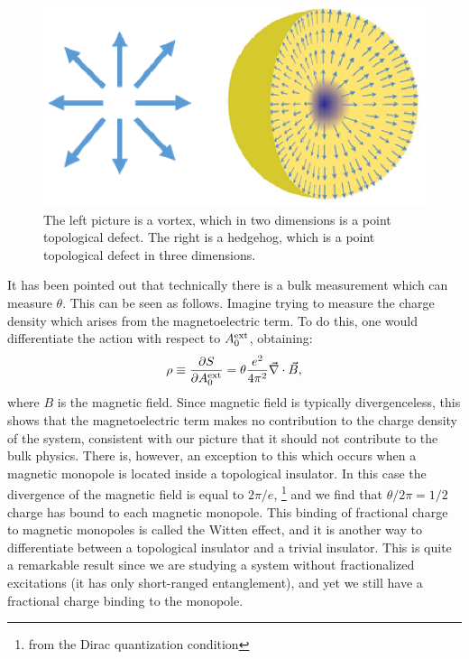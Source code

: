 \begin{figure}
\includegraphics[width=\linewidth]{figures/defects.eps}
\caption{ The left picture is a vortex, which in two dimensions is a point topological defect. The right is a hedgehog, which is a point topological defect in three dimensions.
\label{topo_defects}}
\end{figure}

It has been pointed out \cite{FranzWitten} that technically there is a bulk measurement which can measure $\theta$. This can be seen as follows. Imagine trying to measure the charge density which arises from the magnetoelectric term. To do this, one would differentiate the action with respect to $A^{\rm ext}_0$, obtaining:
\begin{equation}
\rho\equiv\frac{\partial S}{\partial A^{\rm ext}_0}=\theta\frac{e^2}{4\pi^2}\vec{\nabla}\cdot \vec{B},
\end{equation}
where $B$ is the magnetic field. Since magnetic field is typically divergenceless, this shows that the magnetoelectric term makes no contribution to the charge density of the system, consistent with our picture that it should not contribute to the bulk physics. There is, however, an exception to this which occurs when a magnetic monopole is located inside a topological insulator. In this case the divergence of the magnetic field is equal to $2\pi/e$,
\footnote{from the Dirac quantization condition}
 and we find that $\theta/2\pi=1/2$ charge has bound to each magnetic monopole. This binding of fractional charge to magnetic monopoles is called the Witten effect, and it is another way to differentiate between a topological insulator and a trivial insulator. This is quite a remarkable result since we are studying a system without fractionalized excitations (it has only short-ranged entanglement), and yet we still have a fractional charge binding to the monopole.


